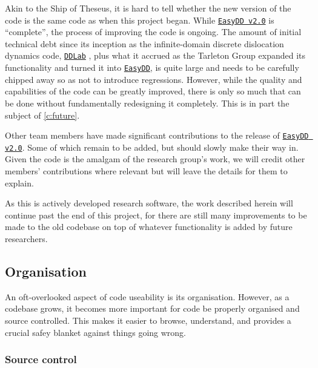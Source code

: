 Akin to the Ship of Theseus, it is hard to tell whether the new version of the code is the same code as when this project began. While \href{https://github.com/TarletonGroup/EasyDD}{\texttt{EasyDD v2.0}} is ``complete'', the process of improving the code is ongoing. The amount of initial technical debt since its inception as the infinite-domain discrete dislocation dynamics code, \href{http://micro.stanford.edu/wiki/Main_Page}{\texttt{DDLab}} \cite{ddlab}, plus what it accrued as the Tarleton Group expanded its functionality and turned it into \href{https://github.com/TarletonGroup/EasyDD/tree/65907b022d1fe408fc1b2e5c5ca2bd1797ccae04}{\texttt{EasyDD}}, is quite large and needs to be carefully chipped away so as not to introduce regressions. However, while the quality and capabilities of the code can be greatly improved, there is only so much that can be done without fundamentally redesigning it completely. This is in part the subject of \cref{c:future}.

Other team members have made significant contributions to the release of \href{https://github.com/TarletonGroup/EasyDD}{\texttt{EasyDD v2.0}}. Some of which remain to be added, but should slowly make their way in. Given the code is the amalgam of the research group's work, we will credit other members' contributions where relevant but will leave the details for them to explain.

As this is actively developed research software, the work described herein will continue past the end of this project, for there are still many improvements to be made to the old codebase on top of whatever functionality is added by future researchers.

\subsection{Organisation}

An oft-overlooked aspect of code useability is its organisation. However, as a codebase grows, it becomes more important for code be properly organised and source controlled. This makes it easier to browse, understand, and provides a crucial safey blanket against things going wrong.

\subsubsection{Source control}

